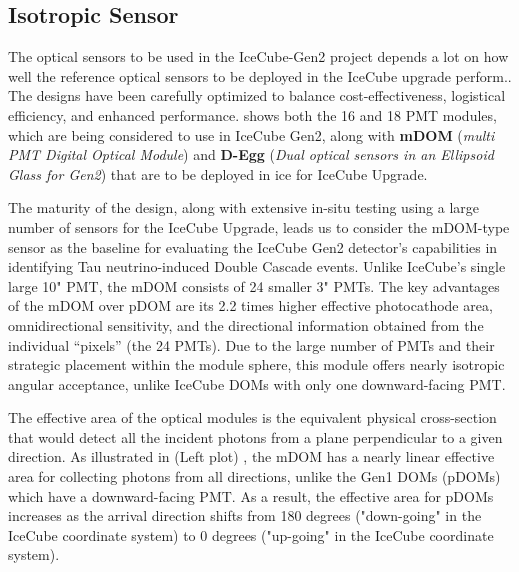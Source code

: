 \subsection{Isotropic Sensor}
\label{sec:isopdom}
The optical sensors to be used in the IceCube-Gen2 project depends a lot on how well the reference optical sensors to be deployed in the IceCube upgrade perform.. The designs have been carefully optimized to balance cost-effectiveness, logistical efficiency, and enhanced performance.  shows both the 16 and 18 PMT modules, which are being considered to use in IceCube Gen2, along with \textbf{mDOM} (\emph{multi PMT Digital Optical Module})  and \textbf{D-Egg} (\emph{Dual optical sensors in an Ellipsoid Glass for Gen2})  that are to be deployed in ice for IceCube Upgrade.


The maturity of the design, along with extensive in-situ testing using a large number of sensors for the IceCube Upgrade, leads us to consider the mDOM-type sensor as the baseline for evaluating the IceCube Gen2 detector's capabilities in identifying Tau neutrino-induced Double Cascade events. Unlike IceCube’s single large 10" PMT, the mDOM consists of 24 smaller 3" PMTs. The key advantages of the mDOM over pDOM   are its 2.2 times higher effective photocathode area, omnidirectional sensitivity, and the directional information obtained from the individual “pixels” (the 24 PMTs). Due to the large number of PMTs and their strategic placement within the module sphere, this module offers nearly isotropic angular acceptance, unlike IceCube DOMs with only one downward-facing PMT. 

The effective area of the optical modules is the equivalent physical cross-section that would detect all the incident photons from a plane perpendicular to a given direction. As illustrated in  (Left plot) , the mDOM has a nearly linear effective area for collecting photons from all directions, unlike the Gen1 DOMs (pDOMs) which have a downward-facing PMT. As a result, the effective area for pDOMs increases as the arrival direction shifts from 180 degrees ("down-going" in the IceCube coordinate system) to 0 degrees ("up-going" in the IceCube coordinate system).

